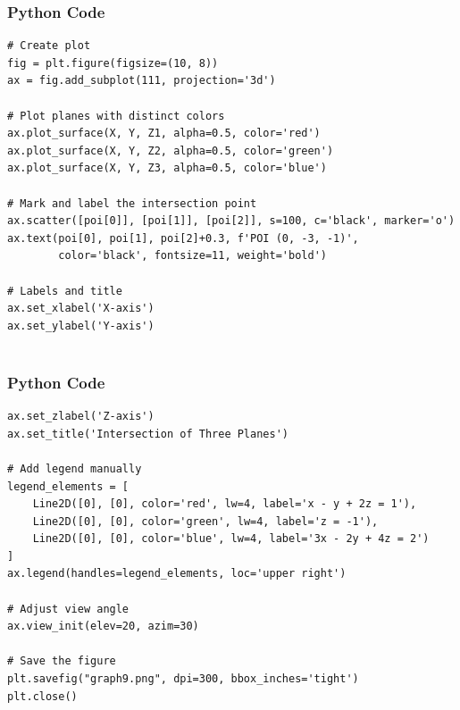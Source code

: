 \documentclass{beamer}
\begin{document}
\begin{frame}[fragile]
    \frametitle{Python Code }

    \begin{lstlisting}
# Create plot
fig = plt.figure(figsize=(10, 8))
ax = fig.add_subplot(111, projection='3d')

# Plot planes with distinct colors
ax.plot_surface(X, Y, Z1, alpha=0.5, color='red')
ax.plot_surface(X, Y, Z2, alpha=0.5, color='green')
ax.plot_surface(X, Y, Z3, alpha=0.5, color='blue')

# Mark and label the intersection point
ax.scatter([poi[0]], [poi[1]], [poi[2]], s=100, c='black', marker='o')
ax.text(poi[0], poi[1], poi[2]+0.3, f'POI (0, -3, -1)', 
        color='black', fontsize=11, weight='bold')

# Labels and title
ax.set_xlabel('X-axis')
ax.set_ylabel('Y-axis')


    \end{lstlisting}
\end{frame}

\begin{frame}[fragile]
    \frametitle{Python Code}

    \begin{lstlisting}
ax.set_zlabel('Z-axis')
ax.set_title('Intersection of Three Planes')

# Add legend manually
legend_elements = [
    Line2D([0], [0], color='red', lw=4, label='x - y + 2z = 1'),
    Line2D([0], [0], color='green', lw=4, label='z = -1'),
    Line2D([0], [0], color='blue', lw=4, label='3x - 2y + 4z = 2')
]
ax.legend(handles=legend_elements, loc='upper right')

# Adjust view angle
ax.view_init(elev=20, azim=30)

# Save the figure
plt.savefig("graph9.png", dpi=300, bbox_inches='tight')
plt.close()



  \end{lstlisting}
\end{frame}
\end{document}
